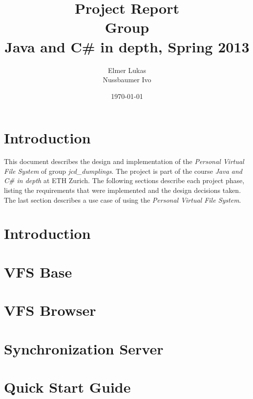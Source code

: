 \documentclass[a4paper,12pt]{article}
\title{
Project Report \\ 
Group \groupname \\
\vspace{5mm}
\large Java and C\# in depth, Spring 2013
}
\author{
Elmer Lukas \\
Nussbaumer Ivo
}
\date{\today}
\newcommand{\groupname}{jcd\_dumplings\xspace}
\begin{document}
\maketitle

\section{Introduction}

This document describes the design and implementation of the \emph{Personal Virtual File System} of group \emph{\groupname}. The project is part of the course \emph{Java and C\# in depth} at ETH Zurich. The following sections describe each project phase, listing the requirements that were implemented and the design decisions taken. The last section describes a use case of using the \emph{Personal Virtual File System}.



\section{Introduction}





\section{VFS Base}




\section{VFS Browser}




\section{Synchronization Server}





\section{Quick Start Guide}


\end{document}

